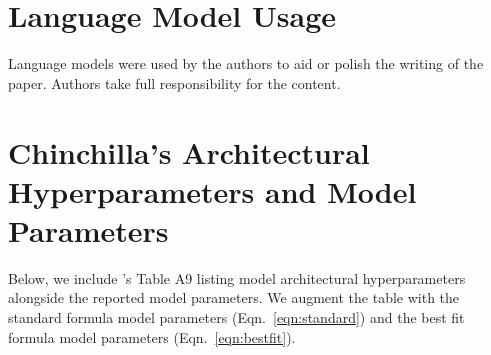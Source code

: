 \section{Language Model Usage}

Language models were used by the authors to aid or polish the writing of the paper.
Authors take full responsibility for the content.

\clearpage

\section{Chinchilla's Architectural Hyperparameters and Model Parameters}
\label{app:sec:chinchilla_table_a9}

Below, we include \citet{hoffman2022chinchilla}'s Table A9 listing model architectural hyperparameters alongside the reported model parameters. We augment the table with the standard formula model parameters (Eqn.~\ref{eqn:standard}) and the best fit formula model parameters (Eqn.~\ref{eqn:bestfit}).

